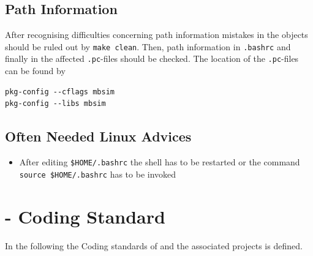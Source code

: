 \subsection{Path Information}
After recognising difficulties concerning path information mistakes in the objects should be ruled out by \texttt{make clean}. Then, path information in \texttt{.bashrc} and finally in the affected \texttt{.pc}-files should be checked. The location of the \texttt{.pc}-files can be found by
\begin{verbatim}
pkg-config --cflags mbsim
pkg-config --libs mbsim
\end{verbatim}

\subsection{Often Needed Linux Advices}
\begin{itemize}
\item After editing \texttt{\$HOME/.bashrc} the shell has to be restarted or the command \texttt{source \$HOME/.bashrc} has to be invoked
\end{itemize}

\section{\MBSim{} - Coding Standard}
In the following the Coding standards of \MBSim{} and the associated projects is defined.
